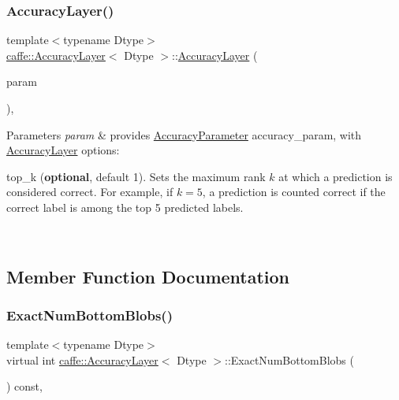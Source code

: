 \subsubsection{\texorpdfstring{Accuracy\+Layer()}{AccuracyLayer()}\hspace{0.1cm}{\footnotesize\ttfamily [2/2]}}
{\footnotesize\ttfamily template$<$typename Dtype$>$ \\
\mbox{\hyperlink{classcaffe_1_1_accuracy_layer}{caffe\+::\+Accuracy\+Layer}}$<$ Dtype $>$\+::\mbox{\hyperlink{classcaffe_1_1_accuracy_layer}{Accuracy\+Layer}} (\begin{DoxyParamCaption}\item[{const \mbox{\hyperlink{classcaffe_1_1_layer_parameter}{Layer\+Parameter}} \&}]{param }\end{DoxyParamCaption})\hspace{0.3cm}{\ttfamily [inline]}, {\ttfamily [explicit]}}


\begin{DoxyParams}{Parameters}
{\em param} & provides \mbox{\hyperlink{classcaffe_1_1_accuracy_parameter}{Accuracy\+Parameter}} accuracy\+\_\+param, with \mbox{\hyperlink{classcaffe_1_1_accuracy_layer}{Accuracy\+Layer}} options\+:
\begin{DoxyItemize}
\item top\+\_\+k ({\bfseries optional}, default 1). Sets the maximum rank $ k $ at which a prediction is considered correct. For example, if $ k = 5 $, a prediction is counted correct if the correct label is among the top 5 predicted labels. 
\end{DoxyItemize}\\
\hline
\end{DoxyParams}


\subsection{Member Function Documentation}
\mbox{\label{classcaffe_1_1_accuracy_layer_afb0d3db8e4a18bec0e05d54d11453ef1}} 
\subsubsection{\texorpdfstring{Exact\+Num\+Bottom\+Blobs()}{ExactNumBottomBlobs()}\hspace{0.1cm}{\footnotesize\ttfamily [1/2]}}
{\footnotesize\ttfamily template$<$typename Dtype$>$ \\
virtual int \mbox{\hyperlink{classcaffe_1_1_accuracy_layer}{caffe\+::\+Accuracy\+Layer}}$<$ Dtype $>$\+::Exact\+Num\+Bottom\+Blobs (\begin{DoxyParamCaption}{ }\end{DoxyParamCaption}) const\hspace{0.3cm}{\ttfamily [inline]}, {\ttfamily [virtual]}}



